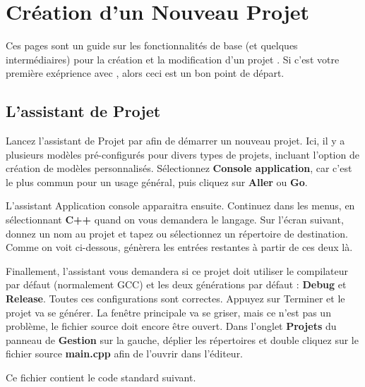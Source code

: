 \section{Création d'un Nouveau Projet}\label{sec:create_project}

Ces pages sont un guide sur les fonctionnalités de base (et quelques intermédiaires) pour la création et la modification d'un projet \codeblocks. Si c'est votre première exéprience avec \codeblocks, alors ceci est un bon point de départ. 
 
\subsection{L'assistant de Projet}

Lancez l'assistant de Projet par  afin de démarrer un nouveau projet. Ici, il y a plusieurs modèles pré-configurés pour divers types de projets, incluant l'option de création de modèles personnalisés. Sélectionnez  \textbf{Console application}, car c'est le plus commun pour un usage général, puis cliquez sur \textbf{Aller} ou \textbf{Go}. 



L'assistant Application console apparaitra ensuite. Continuez dans les menus, en sélectionnant \textbf{C++} quand on vous demandera le langage. Sur l'écran suivant, donnez un nom au projet et tapez ou sélectionnez un répertoire de destination. Comme on voit ci-dessous, \codeblocks génèrera les entrées restantes à partir de ces deux là. 


Finallement, l'assistant vous demandera si ce projet doit utiliser le compilateur par défaut (normalement GCC) et les deux générations par défaut : \textbf{Debug} et \textbf{Release}. Toutes ces configurations sont correctes. Appuyez sur Terminer et le projet va se générer. La fenêtre principale va se griser, mais ce n'est pas un problème, le fichier source doit encore être ouvert. Dans l'onglet \textbf{Projets} du panneau de \textbf{Gestion} sur la gauche, déplier les répertoires et double cliquez sur le fichier source \textbf{main.cpp} afin de l'ouvrir dans l'éditeur. 

Ce fichier contient le code standard suivant.

